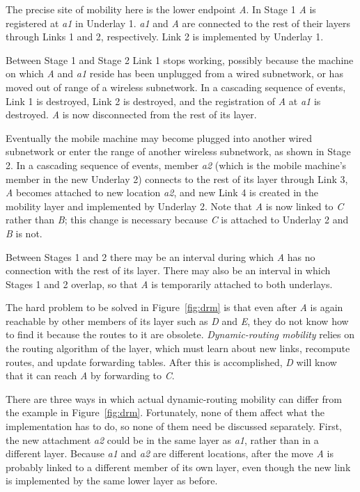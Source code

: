 The precise site of mobility here is the lower endpoint {\it A}.
In Stage 1 {\it A} is registered at {\it a1} in
Underlay 1.
{\it a1} and {\it A} are connected to the rest of their layers
through Links 1 and 2, respectively.  
Link 2 is implemented by Underlay 1.

Between Stage 1 and Stage 2
Link 1 stops working, possibly because the machine on which
{\it A} and {\it a1} reside has
been unplugged from a wired subnetwork, or
has moved out of range of a wireless subnetwork.
In a cascading sequence of events, 
Link 1 is destroyed,
Link 2 is destroyed, and the registration
of {\it A} at {\it a1} is destroyed. 
{\it A} is now disconnected from the rest of its layer.

Eventually the mobile machine may become plugged into another
wired subnetwork
or enter the range of another wireless subnetwork, as shown in Stage 2.
In a cascading sequence of events, member {\it a2} (which is
the mobile machine's member in the new Underlay 2)
connects to the rest of its layer through Link 3,
{\it A} becomes attached to new location {\it a2}, and new Link 4 is
created in the mobility layer and implemented by Underlay 2.
Note that {\it A} is now linked to {\it C} rather than {\it B};
this change is necessary because {\it C} is attached to Underlay 2 and
{\it B} is not.

Between Stages 1 and 2 there may be an interval during which {\it A}
has no connection with the rest of its layer.
There may also be an interval in which Stages 1 and 2 overlap, so
that {\it A} is temporarily attached to both underlays.

The hard problem to be solved in Figure~\ref{fig:drm} is that 
even after {\it A} is again reachable by other members of its layer
such as {\it D} and {\it E}, they do not know how to find it because
the routes to it are obsolete.
{\it Dynamic-routing mobility} relies on the routing algorithm of
the layer, which must learn about new links, recompute routes,
and update forwarding tables.
After this is accomplished, {\it D} will know that it can reach
{\it A} by forwarding to {\it C}.

There are three ways in which actual dynamic-routing
mobility can differ from the
example in Figure~\ref{fig:drm}.
Fortunately, none of them affect what the implementation has to do,
so none of them need be discussed separately.
First, the new attachment {\it a2} could be in the same layer as 
{\it a1}, rather than in a different layer.
Because {\it a1} and {\it a2} are different locations,
after the move {\it A} is probably linked to
a different member of its own layer, even though the new link is
implemented by the same lower layer as before.


